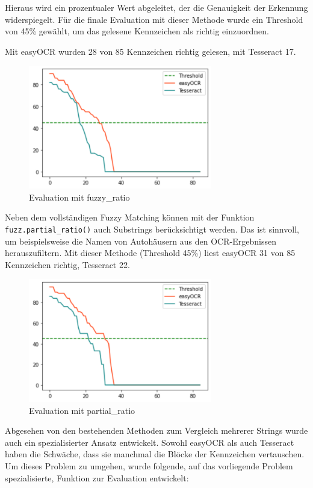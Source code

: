 Hieraus wird ein prozentualer Wert abgeleitet, der die Genauigkeit der Erkennung widerspiegelt.
Für die finale Evaluation mit dieser Methode wurde ein Threshold von 45\% gewählt, um das gelesene Kennzeichen als richtig einzuordnen.

Mit easyOCR wurden 28 von 85 Kennzeichen richtig gelesen, mit Tesseract 17.
\begin{figure}[h]
	\includegraphics[width=8cm]{./img/evaluation_fuzzy_ratio.svg}
	\caption{Evaluation mit fuzzy_ratio}
\end{figure}

Neben dem vollständigen Fuzzy Matching können mit der Funktion \lstinline{fuzz.partial_ratio()} auch Substrings berücksichtigt werden.
Das ist sinnvoll, um beispielsweise die Namen von Autohäusern aus den OCR-Ergebnissen herauszufiltern.
Mit dieser Methode (Threshold 45\%) liest easyOCR 31 von 85 Kennzeichen richtig, Tesseract 22.
\begin{figure}[h]
	\includegraphics[width=8cm]{./img/evaluation_partial_ratio.svg}
	\caption{Evaluation mit partial_ratio}
\end{figure}


Abgesehen von den bestehenden Methoden zum Vergleich mehrerer Strings wurde auch ein spezialisierter Ansatz entwickelt. Sowohl easyOCR als auch Tesseract haben die Schwäche, dass sie manchmal die Blöcke der Kennzeichen vertauschen. Um dieses Problem zu umgehen, wurde folgende, auf das vorliegende Problem spezialisierte, Funktion zur Evaluation entwickelt:

